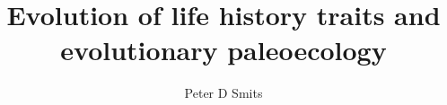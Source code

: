 \documentclass{beamer}
\title{Evolution of life history traits and evolutionary paleoecology}
\author{Peter D Smits}
\institute{Committee on Evolutionary Biology, University of Chicago}
\begin{document}
\begin{frame}
  \maketitle
\end{frame}

%
%
%
\end{document}
